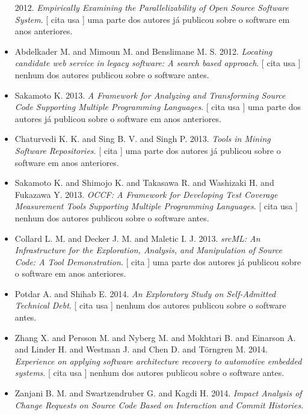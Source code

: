 \begin{itemize}
      2012.
        \textit{ Empirically Examining the Parallelizability of Open Source Software System}.
      [
          cita
          usa
      ]
uma parte dos autores já publicou sobre o software em anos anteriores.
\item Abdelkader M. and Mimoun M. and Benslimane M. S.
      2012.
        \textit{ Locating candidate web service in legacy software: A search based approach}.
      [
          cita
          usa
      ]
nenhum dos autores publicou sobre o software antes.
\item Sakamoto K.
      2013.
        \textit{ A Framework for Analyzing and Transforming Source Code Supporting Multiple Programming Languages}.
      [
          cita
          usa
      ]
uma parte dos autores já publicou sobre o software em anos anteriores.
\item Chaturvedi K. K. and Sing B. V. and Singh P.
      2013.
        \textit{ Tools in Mining Software Repositories}.
      [
          cita
      ]
uma parte dos autores já publicou sobre o software em anos anteriores.
\item Sakamoto K. and Shimojo K. and Takasawa R. and Washizaki H. and Fukazawa Y.
      2013.
        \textit{ OCCF: A Framework for Developing Test Coverage Measurement Tools Supporting Multiple Programming Languages}.
      [
          cita
          usa
      ]
nenhum dos autores publicou sobre o software antes.
\item Collard L. M. and Decker J. M. and Maletic I. J.
      2013.
        \textit{ srcML: An Infrastructure for the Exploration, Analysis, and Manipulation of Source Code: A Tool Demonstration}.
      [
          cita
      ]
uma parte dos autores já publicou sobre o software em anos anteriores.
\item Potdar A. and Shihab E.
      2014.
        \textit{ An Exploratory Study on Self-Admitted Technical Debt}.
      [
          cita
          usa
      ]
nenhum dos autores publicou sobre o software antes.
\item Zhang X. and Persson M. and Nyberg M. and Mokhtari B. and Einarson A. and Linder H. and Westman J. and Chen D. and Törngren M.
      2014.
        \textit{ Experience on applying software architecture recovery to automotive embedded systems}.
      [
          cita
          usa
      ]
nenhum dos autores publicou sobre o software antes.
\item Zanjani B. M. and Swartzendruber G. and Kagdi H.
      2014.
        \textit{ Impact Analysis of Change Requests on Source Code Based on Interaction and Commit Histories}.

\end{itemize}
